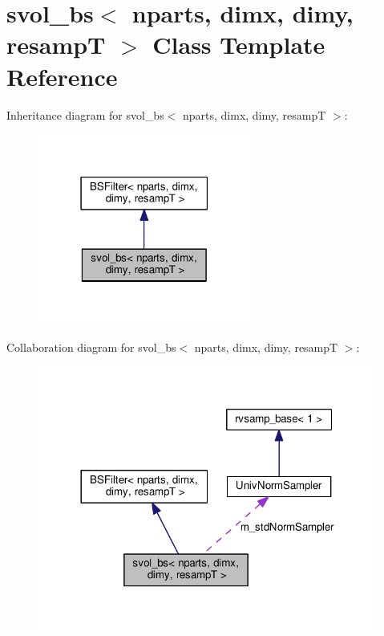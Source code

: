 \hypertarget{classsvol__bs}{}\section{svol\+\_\+bs$<$ nparts, dimx, dimy, resampT $>$ Class Template Reference}
\label{classsvol__bs}


Inheritance diagram for svol\+\_\+bs$<$ nparts, dimx, dimy, resampT $>$\+:
\nopagebreak
\begin{figure}[H]
\begin{center}
\leavevmode
\includegraphics[width=198pt]{classsvol__bs__inherit__graph}
\end{center}
\end{figure}


Collaboration diagram for svol\+\_\+bs$<$ nparts, dimx, dimy, resampT $>$\+:
\nopagebreak
\begin{figure}[H]
\begin{center}
\leavevmode
\includegraphics[width=317pt]{classsvol__bs__coll__graph}
\end{center}
\end{figure}

